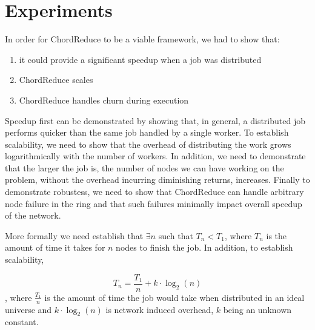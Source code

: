 \documentclass[conference, compsocconf, letterpaper]{IEEEtran}
\begin{document}
\section{Experiments}
In order for ChordReduce to be a viable framework, we had to show that:
\begin{enumerate}
    \item it could provide a significant speedup when a job was distributed
    \item ChordReduce scales
    \item ChordReduce handles churn during execution
\end{enumerate}
Speedup first can be demonstrated by showing that, in general, a distributed job performs quicker than the same job handled by a single worker.  To establish scalability, we need to show that the overhead of distributing the work grows logarithmically with the number of workers.  In addition, we need to demonstrate that the larger the job is, the number of nodes we can have working on the problem, without the overhead incurring diminishing returns, increases. Finally to demonstrate robustess, we need to show that ChordReduce can handle arbitrary node failure in the ring and that such failures minimally impact overall speedup of the network.


More formally we need establish that $\exists n$ such that $T_{n} < T_{1}$, where $T_{n}$ is the amount of time it takes for $n$ nodes to finish the job.  In addition, to establish scalability,

$$T_{n} = \frac{T_{1}}{n} + k \cdot \log_{2}(n)$$, where $\frac{T_{1}}{n}$ is the amount of time the job would take when distributed in an ideal universe and $k \cdot \log_{2}(n)$ is network induced overhead, $k$ being an unknown constant.

%
\end{document}
